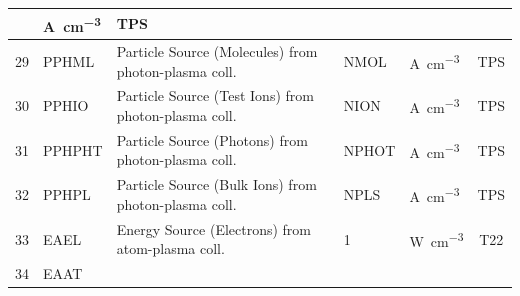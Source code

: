 \begin{landscape}
\begin{longtable}{|r|l|l|l|l|c|}
                                                                   &
    \si{\ampere\per\cubic\centi\metre}                             & TPS
    \\  \hline
    29                                                             & PPHML
                                                                   & Particle Source
    (Molecules) from photon-plasma coll.
                                                                   & NMOL
                                                                   &
    \si{\ampere\per\cubic\centi\metre}                             & TPS
    \\  \hline
    30                                                             & PPHIO
                                                                   & Particle Source (Test
    Ions) from photon-plasma coll.
                                                                   & NION
                                                                   &
    \si{\ampere\per\cubic\centi\metre}                             & TPS
    \\	\hline
    31                                                             & PPHPHT
                                                                   & Particle Source (Photons)
    from photon-plasma coll.
                                                                   & NPHOT
                                                                   &
    \si{\ampere\per\cubic\centi\metre}                             & TPS
    \\	\hline
    32                                                             & PPHPL
                                                                   & Particle Source (Bulk
    Ions) from photon-plasma coll.
                                                                   & NPLS
                                                                   &
    \si{\ampere\per\cubic\centi\metre}                             & TPS
    \\ \hline
    33                                                             & EAEL
                                                                   & Energy Source (Electrons)
    from atom-plasma coll.
                                                                   & 1
                                                                   &
    \si{\watt\per\cubic\centi\metre}                               & T22
    \\  \hline
    34                                                             & EAAT

\end{longtable}
\end{landscape}
